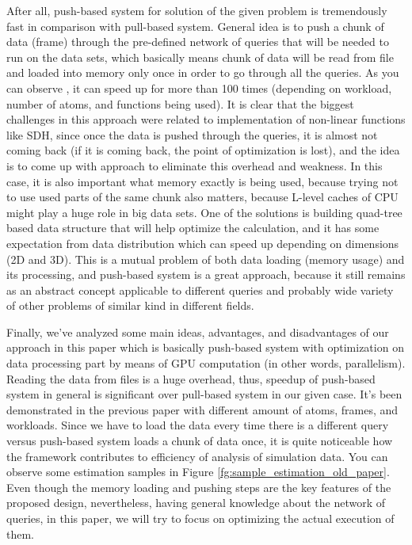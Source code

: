 \documentclass[11pt,a4paper]{report}
\begin{document}
After all, push-based system for solution of the given problem is tremendously fast in comparison with pull-based system. General idea is to push a chunk of data (frame) through the pre-defined network of queries that will be needed to run on the data sets, which basically means chunk of data will be read from file and loaded into memory only once in order to go through all the queries. As you can observe \cite{mainPaper}, it can speed up for more than 100 times (depending on workload, number of atoms, and functions being used). It is clear that the biggest challenges in this approach were related to implementation of non-linear functions like SDH, since once the data is pushed through the queries, it is almost not coming back (if it is coming back, the point of optimization is lost), and the idea is to come up with approach to eliminate this overhead and weakness. In this case, it is also important what memory exactly is being used, because trying not to use used parts of the same chunk also matters, because L-level caches of CPU might play a huge role in big data sets. One of the solutions is building quad-tree based data structure that will help optimize the calculation, and it has some expectation from data distribution which can speed up depending on dimensions (2D and 3D). This is a mutual problem of both data loading (memory usage) and its processing, and push-based system is a great approach, because it still remains as an abstract concept applicable to different queries and probably wide variety of other problems of similar kind in different fields.

Finally, we've analyzed some main ideas, advantages, and disadvantages of our approach in this paper which is basically push-based system with optimization on data processing part by means of GPU computation (in other words, parallelism). Reading the data from files is a huge overhead, thus, speedup of push-based system in general is significant over pull-based system in our given case. 
It's been demonstrated in the previous paper with different amount of atoms, frames, and workloads. Since we have to load the data every time there is a different query versus push-based system loads a chunk of data once, it is quite noticeable how the framework contributes to efficiency of analysis of simulation data. You can observe some estimation samples in Figure \ref{fg:sample_estimation_old_paper}. Even though the memory loading and pushing steps are the key features of the proposed design, nevertheless, having general knowledge about the network of queries, in this paper, we will try to focus on optimizing the actual execution of them.
\end{document}
